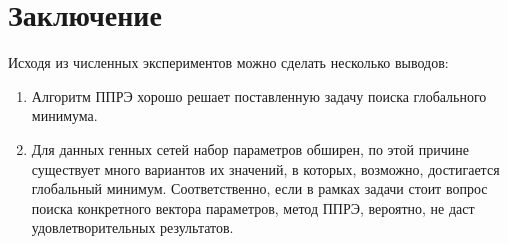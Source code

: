 \chapter*{Заключение}						%

Исходя из численных экспериментов можно сделать несколько выводов:

\begin{enumerate}
	\item Алгоритм ППРЭ хорошо решает поставленную задачу поиска глобального 
	минимума. 
	\item Для данных генных сетей набор параметров обширен, по этой причине 
	существует много вариантов их значений, в которых, возможно, достигается 
	глобальный минимум. Соответственно, если в рамках задачи стоит вопрос поиска 
	конкретного вектора параметров, метод ППРЭ, вероятно, не даст 
	удовлетворительных результатов.
\end{enumerate}

\clearpage
